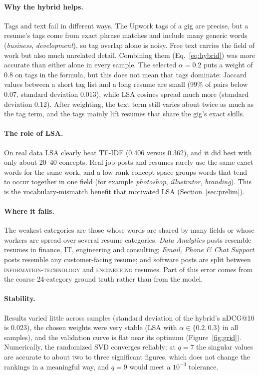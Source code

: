 \documentclass[12pt,a4paper]{article}
\numberwithin{equation}{section}
\theoremstyle{definition}
\theoremstyle{plain}
\begin{document}
\paragraph{Why the hybrid helps.} Tags and text fail in different ways. The Upwork tags of a gig are precise, but a resume's tags come from exact phrase matches and include many generic words (\emph{business}, \emph{development}), so tag overlap alone is noisy. Free text carries the field of work but also much unrelated detail. Combining them (Eq.~\ref{eq:hybrid}) was more accurate than either alone in every sample. The selected $\alpha=0.2$ puts a weight of 0.8 on tags in the formula, but this does not mean that tags dominate: Jaccard values between a short tag list and a long resume are small (99\% of pairs below 0.07, standard deviation 0.013), while LSA cosines spread much more (standard deviation 0.12). After weighting, the text term still varies about twice as much as the tag term, and the tags mainly lift resumes that share the gig's exact skills.

\paragraph{The role of LSA.} On real data LSA clearly beat TF-IDF (0.406 versus 0.362), and it did best with only about 20--40 concepts. Real job posts and resumes rarely use the same exact words for the same work, and a low-rank concept space groups words that tend to occur together in one field (for example \emph{photoshop}, \emph{illustrator}, \emph{branding}). This is the vocabulary-mismatch benefit that motivated LSA (Section~\ref{sec:prelim}).

\paragraph{Where it fails.} The weakest categories are those whose words are shared by many fields or whose workers are spread over several resume categories. \emph{Data Analytics} posts resemble resumes in finance, IT, engineering and consulting; \emph{Email, Phone \& Chat Support} posts resemble any customer-facing resume; and software posts are split between \textsc{information-technology} and \textsc{engineering} resumes. Part of this error comes from the coarse 24-category ground truth rather than from the model.

\paragraph{Stability.} Results varied little across samples (standard deviation of the hybrid's nDCG@10 is 0.023), the chosen weights were very stable (LSA with $\alpha\in\{0.2,0.3\}$ in all samples), and the validation curve is flat near its optimum (Figure~\ref{fig:grid}). Numerically, the randomized SVD converges reliably; at $q=7$ the singular values are accurate to about two to three significant figures, which does not change the rankings in a meaningful way, and $q=9$ would meet a $10^{-3}$ tolerance.
\end{document}
